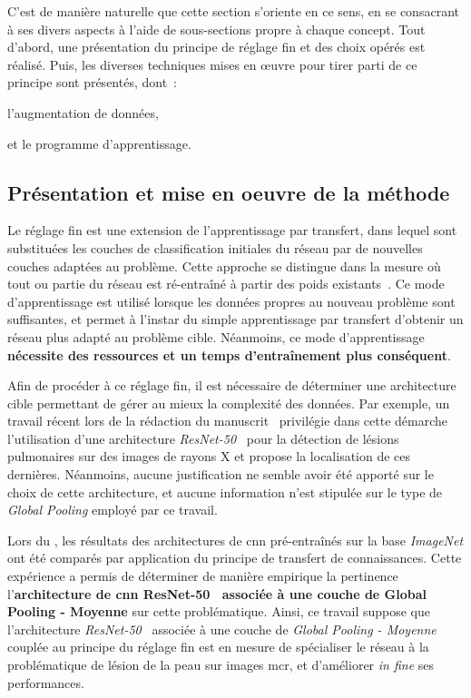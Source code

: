 C'est de manière naturelle que cette section s'oriente en ce sens, en se consacrant à ses divers aspects à l'aide de sous-sections propre à chaque concept. Tout d'abord, une présentation du principe de réglage fin et des choix opérés est réalisé. Puis, les diverses techniques mises en œuvre pour tirer parti de ce principe sont présentés, dont~:
\begin{inlinerate}
    \item l'augmentation de données,
    \item et le programme d'apprentissage.
\end{inlinerate}\par

\subsection{Présentation et mise en oeuvre de la méthode}
Le réglage fin est une extension de l'apprentissage par transfert, dans lequel sont substituées les couches de classification initiales du réseau par de nouvelles couches adaptées au problème. Cette approche se distingue dans la mesure où tout ou partie du réseau est ré-entraîné à partir des poids existants~\cite{Tajbakhsh2016}. Ce mode d'apprentissage est utilisé lorsque les données propres au nouveau problème sont suffisantes, et permet à l'instar du simple apprentissage par transfert d'obtenir un réseau plus adapté au problème cible. Néanmoins, ce mode d'apprentissage \textbf{nécessite des ressources et un temps d'entraînement plus conséquent}.\par

Afin de procéder à ce réglage fin, il est nécessaire de déterminer une architecture cible permettant de gérer au mieux la complexité des données. Par exemple, un travail récent lors de la rédaction du manuscrit~\cite{Park2019} privilégie dans cette démarche l'utilisation d'une architecture \textit{ResNet-50}~\cite{He2016} pour la détection de lésions pulmonaires sur des images de rayons X et propose la localisation de ces dernières. Néanmoins, aucune justification ne semble avoir été apporté sur le choix de cette architecture, et aucune information n'est stipulée sur le type de \textit{Global Pooling} employé par ce travail.\par

Lors du , les résultats des architectures de \gls{cnn} pré-entraînés sur la base \textit{ImageNet} ont été comparés par application du principe de transfert de connaissances. Cette expérience a permis de déterminer de manière empirique la pertinence l'\textbf{architecture de \gls{cnn} ResNet-50~\cite{He2016} associée à une couche de Global Pooling - Moyenne} sur cette problématique. Ainsi, ce travail suppose que l'architecture \textit{ResNet-50}~\cite{He2016} associée à une couche de \textit{Global Pooling - Moyenne} couplée au principe du réglage fin est en mesure de spécialiser le réseau à la problématique de lésion de la peau sur images \gls{mcr}, et d'améliorer \textit{in fine} ses performances.\par

